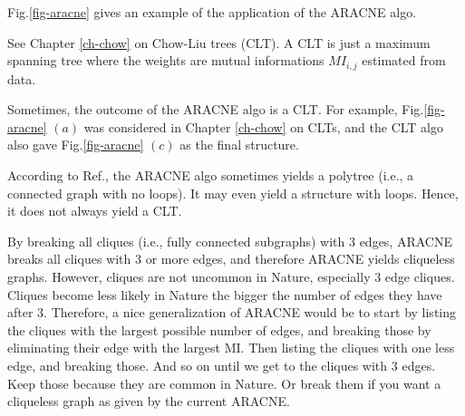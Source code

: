 Fig.\ref{fig-aracne}
gives an example 
of the application
of the ARACNE algo.

See Chapter \ref{ch-chow} on 
Chow-Liu trees (CLT).
A CLT is just
a  maximum spanning tree
where the weights are 
mutual informations 
 $MI_{i,j}$
estimated from data.

Sometimes, the outcome
of the ARACNE algo is a CLT.
For example,
Fig.\ref{fig-aracne}
$(a)$
was considered
in Chapter \ref{ch-chow}
on CLTs, and
the CLT algo
also
gave 
Fig.\ref{fig-aracne}
$(c)$ as the final structure.

According to Ref.\cite{aracne}, the 
 ARACNE algo sometimes 
yields  a polytree (i.e., 
a connected graph with no loops).
It may even  
yield a structure with loops.
Hence, it does not always yield a CLT.

By breaking all cliques (i.e., fully
connected subgraphs)
with 3 edges, ARACNE 
breaks all cliques with  
3 or more edges, and therefore
ARACNE yields cliqueless graphs. 
However, cliques are 
not uncommon in Nature,
especially 3 edge cliques. 
Cliques become less likely in Nature 
the bigger the number of edges they have
after 3.
Therefore, a nice  
generalization of ARACNE
would be to start by listing the 
 cliques with the largest possible number
of edges,
and  breaking those by eliminating
their edge with the largest MI.
Then listing the cliques 
with one less edge, and breaking those.
And so on until
we get to the cliques with 3 edges. 
Keep those because they are common in Nature.
Or break them if you want a cliqueless graph
as given by the current ARACNE.


